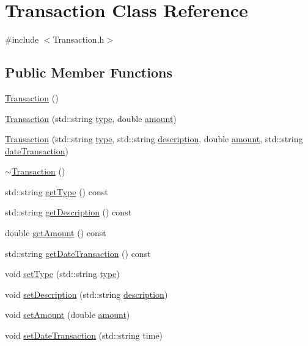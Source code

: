 \hypertarget{classTransaction}{}\section{Transaction Class Reference}
\label{classTransaction}


{\ttfamily \#include $<$Transaction.\+h$>$}

\subsection*{Public Member Functions}
\begin{DoxyCompactItemize}
\item 
\hyperlink{classTransaction_ab47005b855d38bc324bb79fd023baa13}{Transaction} ()
\item 
\hyperlink{classTransaction_a659c102f81a38a3570bb6eac99ada5a6}{Transaction} (std\+::string \hyperlink{classTransaction_a0c0b931f105f8e7d2fe9865f75a4be9c}{type}, double \hyperlink{classTransaction_a79d18292be964d9196985f20474abe64}{amount})
\item 
\hyperlink{classTransaction_a3dd56eac06ccaf2b8ebc3c66bcab9999}{Transaction} (std\+::string \hyperlink{classTransaction_a0c0b931f105f8e7d2fe9865f75a4be9c}{type}, std\+::string \hyperlink{classTransaction_aae986091e9d65be398575a4699a8f1ac}{description}, double \hyperlink{classTransaction_a79d18292be964d9196985f20474abe64}{amount}, std\+::string \hyperlink{classTransaction_ae97bd67fb4e058bc7aac2dff1f1209db}{date\+Transaction})
\item 
\hyperlink{classTransaction_a362b0d2524d0c799165190517192dca9}{$\sim$\+Transaction} ()
\item 
std\+::string \hyperlink{classTransaction_a257cb67b873f06ecfc91934aebb3587c}{get\+Type} () const 
\item 
std\+::string \hyperlink{classTransaction_aa4eeb27808fec3a62f27c19f20262b0e}{get\+Description} () const 
\item 
double \hyperlink{classTransaction_afb4baa2f079dcb60ad3545dde79cd818}{get\+Amount} () const 
\item 
std\+::string \hyperlink{classTransaction_a5809112faa0b3e18f63811e1ad4ac6d0}{get\+Date\+Transaction} () const 
\item 
void \hyperlink{classTransaction_a0657733a02ef72e2b0a91d72e7ac9e6b}{set\+Type} (std\+::string \hyperlink{classTransaction_a0c0b931f105f8e7d2fe9865f75a4be9c}{type})
\item 
void \hyperlink{classTransaction_a215255f793c935956e92e8df4617a9ee}{set\+Description} (std\+::string \hyperlink{classTransaction_aae986091e9d65be398575a4699a8f1ac}{description})
\item 
void \hyperlink{classTransaction_a5739a6ee96902de5f2677979a51bd7e5}{set\+Amount} (double \hyperlink{classTransaction_a79d18292be964d9196985f20474abe64}{amount})
\item 
void \hyperlink{classTransaction_ad11438633ce5b8e29aaa68afc402a1a3}{set\+Date\+Transaction} (std\+::string time)
\end{DoxyCompactItemize}
